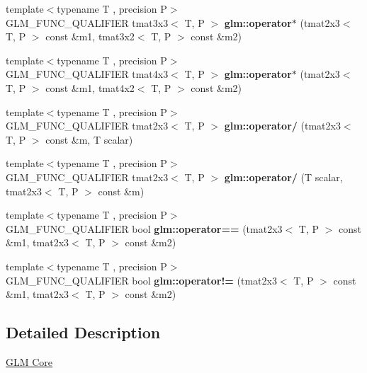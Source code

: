 \begin{DoxyCompactItemize}
\item 
\mbox{\label{type__mat2x3_8inl_ad6e371f1de55e754fdde27898d29c377}} 
{\footnotesize template$<$typename T , precision P$>$ }\\G\+L\+M\+\_\+\+F\+U\+N\+C\+\_\+\+Q\+U\+A\+L\+I\+F\+I\+ER tmat3x3$<$ T, P $>$ {\bfseries glm\+::operator$\ast$} (tmat2x3$<$ T, P $>$ const \&m1, tmat3x2$<$ T, P $>$ const \&m2)
\item 
\mbox{\label{type__mat2x3_8inl_ad6fbbb47791ef5cf25d6e85478b0ac07}} 
{\footnotesize template$<$typename T , precision P$>$ }\\G\+L\+M\+\_\+\+F\+U\+N\+C\+\_\+\+Q\+U\+A\+L\+I\+F\+I\+ER tmat4x3$<$ T, P $>$ {\bfseries glm\+::operator$\ast$} (tmat2x3$<$ T, P $>$ const \&m1, tmat4x2$<$ T, P $>$ const \&m2)
\item 
\mbox{\label{type__mat2x3_8inl_ad78a0fb46bc094b31d0ee144a9316830}} 
{\footnotesize template$<$typename T , precision P$>$ }\\G\+L\+M\+\_\+\+F\+U\+N\+C\+\_\+\+Q\+U\+A\+L\+I\+F\+I\+ER tmat2x3$<$ T, P $>$ {\bfseries glm\+::operator/} (tmat2x3$<$ T, P $>$ const \&m, T scalar)
\item 
\mbox{\label{type__mat2x3_8inl_ae913d17dd2dd1f90234509c4384a7790}} 
{\footnotesize template$<$typename T , precision P$>$ }\\G\+L\+M\+\_\+\+F\+U\+N\+C\+\_\+\+Q\+U\+A\+L\+I\+F\+I\+ER tmat2x3$<$ T, P $>$ {\bfseries glm\+::operator/} (T scalar, tmat2x3$<$ T, P $>$ const \&m)
\item 
\mbox{\label{type__mat2x3_8inl_ac912517a461de497022d75ec4de3dba5}} 
{\footnotesize template$<$typename T , precision P$>$ }\\G\+L\+M\+\_\+\+F\+U\+N\+C\+\_\+\+Q\+U\+A\+L\+I\+F\+I\+ER bool {\bfseries glm\+::operator==} (tmat2x3$<$ T, P $>$ const \&m1, tmat2x3$<$ T, P $>$ const \&m2)
\item 
\mbox{\label{type__mat2x3_8inl_aa83d47e20bf01d8d4009de4d5440c457}} 
{\footnotesize template$<$typename T , precision P$>$ }\\G\+L\+M\+\_\+\+F\+U\+N\+C\+\_\+\+Q\+U\+A\+L\+I\+F\+I\+ER bool {\bfseries glm\+::operator!=} (tmat2x3$<$ T, P $>$ const \&m1, tmat2x3$<$ T, P $>$ const \&m2)
\end{DoxyCompactItemize}


\subsection{Detailed Description}
\hyperlink{group__core}{G\+LM Core} 